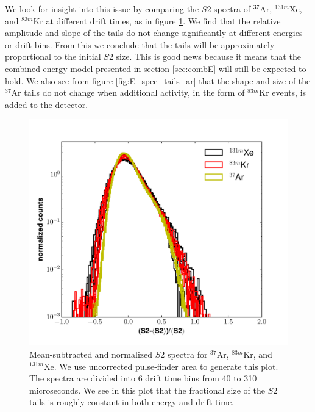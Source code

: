 {We look for insight into this issue by comparing the $S2$ spectra of $^{37}$Ar, $^{131m}$Xe, and $^{83m}$Kr at different drift times, as in figure \ref{fig:E_spec_tails}. We find that the relative amplitude and slope of the tails do not change significantly at different energies or drift bins. From this we conclude that the tails will be approximately proportional to the initial $S2$ size. This is good news because it means that the combined energy model presented in section \ref{sec:combE} will still be expected to hold. We also see from figure \ref{fig:E_spec_tails_ar} that the shape and size of the $^{37}$Ar tails do not change when additional activity, in the form of $^{83m}$Kr events, is added to the detector.
\begin{figure}[h!]
  \centering
  \includegraphics[width=\textwidth]{Figures/S2_tail_spec_all.pdf}
  \caption{Mean-subtracted and normalized $S2$ spectra for $^{37}$Ar, $^{83m}$Kr, and $^{131m}$Xe. We use uncorrected pulse-finder area to generate this plot. The spectra are divided into 6 drift time bins from 40 to 310 microseconds. We see in this plot that the fractional size of the $S2$ tails is roughly constant in both energy and drift time.}
\label{fig:E_spec_tails} 
\end{figure}

}
